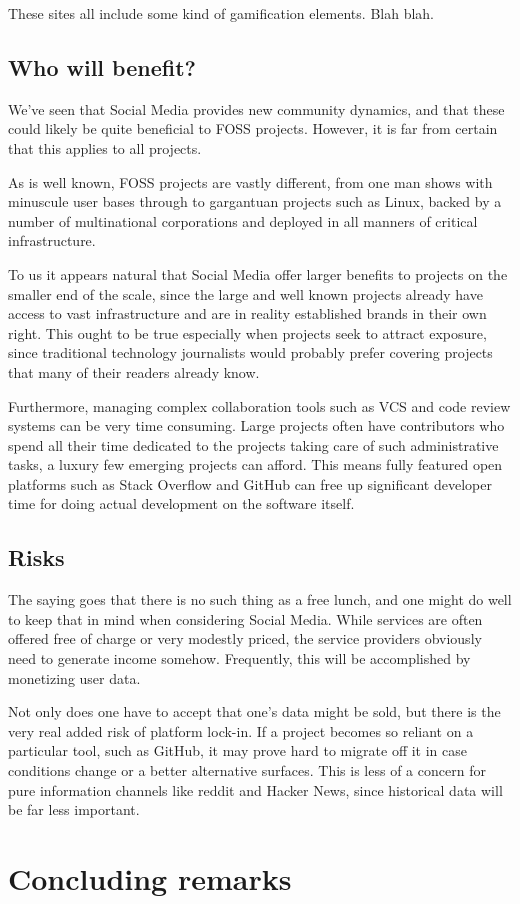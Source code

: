 \documentclass[a4paper,11pt]{article} %
\begin{document}
These sites all include some kind of gamification elements. Blah blah.

\subsection{Who will benefit?}

We've seen that Social Media provides new community dynamics, and that
these could likely be quite beneficial to FOSS projects. However, it
is far from certain that this applies to all projects.

As is well known, FOSS projects are vastly different, from one man
shows with minuscule user bases through to gargantuan projects such as
Linux, backed by a number of multinational corporations and deployed
in all manners of critical infrastructure.

To us it appears natural that Social Media offer larger benefits to
projects on the smaller end of the scale, since the large and well
known projects already have access to vast infrastructure and are in
reality established brands in their own right. This ought to be true
especially when projects seek to attract exposure, since traditional
technology journalists would probably prefer covering projects that
many of their readers already know.

Furthermore, managing complex collaboration tools such as VCS and code
review systems can be very time consuming. Large projects often have
contributors who spend all their time dedicated to the projects taking
care of such administrative tasks, a luxury few emerging projects can
afford. This means fully featured open platforms such as Stack
Overflow and GitHub can free up significant developer time for doing
actual development on the software itself.

\subsection{Risks}

The saying goes that there is no such thing as a free lunch, and one
might do well to keep that in mind when considering Social
Media. While services are often offered free of charge or very
modestly priced, the service providers obviously need to generate
income somehow. Frequently, this will be accomplished by monetizing
user data.

Not only does one have to accept that one's data might be sold, but
there is the very real added risk of platform lock-in. If a project
becomes so reliant on a particular tool, such as GitHub, it may prove
hard to migrate off it in case conditions change or a better
alternative surfaces. This is less of a concern for pure information
channels like reddit and Hacker News, since historical data will be
far less important.

\section{Concluding remarks}

\newpage
\printbibliography
\end{document}

